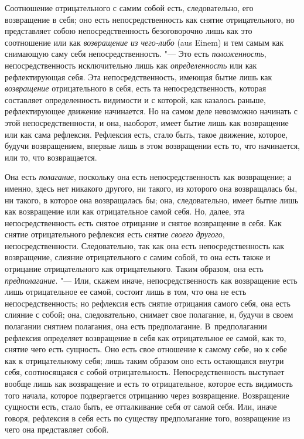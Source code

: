 Соотношение отрицательного с самим собой есть, следовательно, его
возвращение в себя; оно есть непосредственность как снятие отрицательного,
но представляет собою непосредственность безоговорочно лишь как это
соотношение или как {\em возвращение из чего-либо} (aus
Einem) и тем самым как снимающую саму себя непосредственность. "--- Это есть
{\em положенность}, непосредственность исключительно
лишь как {\em определенность} или как рефлектирующая
себя. Эта непосредственность, имеющая бытие лишь как
{\em возвращение} отрицательного в себя, есть та
непосредственность, которая составляет определенность видимости и с
которой, как казалось раньше, рефлектирующее движение начинается. Но на
самом деле невозможно начинать с этой непосредственности, и она, наоборот,
имеет бытие лишь как возвращение или как сама рефлексия. Рефлексия есть,
стало быть, такое движение, которое, будучи возвращением, впервые лишь в
этом возвращении есть то, что начинается, или то, что возвращается.

Она есть {\em полагание}, поскольку она есть
непосредственность как возвращение; а именно, здесь нет никакого другого,
ни такого, из которого она возвращалась бы, ни такого, в которое она
возвращалась бы; она, следовательно, имеет бытие лишь как возвращение или
как отрицательное самой себя. Но, далее, эта непосредственность есть снятое
отрицание и снятое возвращение в себя. Как снятие отрицательного рефлексия
есть снятие {\em своего другого}, непосредственности.
Следовательно, так как она есть непосредственность как возвращение, слияние
отрицательного с самим собой, то она есть также и отрицание отрицательного
как отрицательного. Таким образом, она есть
{\em предполагание}. "--- Или, скажем иначе,
непосредственность как возвращение есть лишь отрицательное ее самой,
состоит лишь в том, что она не есть непосредственность; но рефлексия есть
снятие отрицания самого себя, она есть слияние с собой; она, следовательно,
снимает свое полагание, и, будучи в своем полагании снятием полагания, она
есть предполагание. В~предполагании рефлексия определяет возвращение в себя
как отрицательное ее самой, как то, снятие чего есть сущность. Оно есть
свое отношение к самому себе, но к себе как к отрицательному себя; лишь
таким образом оно есть остающаяся внутри себя, соотносящаяся с собой
отрицательность. Непосредственность выступает вообще лишь как возвращение и
есть то отрицательное, которое есть видимость того начала, которое
подвергается отрицанию через возвращение. Возвращение сущности есть, стало
быть, ее отталкивание себя от самой себя. Или, иначе говоря, рефлексия в
себя есть по существу предполагание того, возвращение из чего она
представляет собой.

